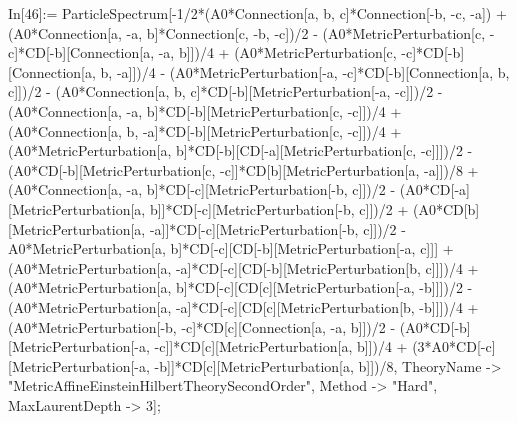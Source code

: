In[46]:= ParticleSpectrum[-1/2*(A0*Connection[a, b, c]*Connection[-b, -c, -a]) + (A0*Connection[a, -a, b]*Connection[c, -b, -c])/2 - (A0*MetricPerturbation[c, -c]*CD[-b][Connection[a, -a, b]])/4 + (A0*MetricPerturbation[c, -c]*CD[-b][Connection[a, b, -a]])/4 - (A0*MetricPerturbation[-a, -c]*CD[-b][Connection[a, b, c]])/2 - (A0*Connection[a, b, c]*CD[-b][MetricPerturbation[-a, -c]])/2 - (A0*Connection[a, -a, b]*CD[-b][MetricPerturbation[c, -c]])/4 + (A0*Connection[a, b, -a]*CD[-b][MetricPerturbation[c, -c]])/4 + (A0*MetricPerturbation[a, b]*CD[-b][CD[-a][MetricPerturbation[c, -c]]])/2 - (A0*CD[-b][MetricPerturbation[c, -c]]*CD[b][MetricPerturbation[a, -a]])/8 + (A0*Connection[a, -a, b]*CD[-c][MetricPerturbation[-b, c]])/2 - (A0*CD[-a][MetricPerturbation[a, b]]*CD[-c][MetricPerturbation[-b, c]])/2 + (A0*CD[b][MetricPerturbation[a, -a]]*CD[-c][MetricPerturbation[-b, c]])/2 - A0*MetricPerturbation[a, b]*CD[-c][CD[-b][MetricPerturbation[-a, c]]] + (A0*MetricPerturbation[a, -a]*CD[-c][CD[-b][MetricPerturbation[b, c]]])/4 + (A0*MetricPerturbation[a, b]*CD[-c][CD[c][MetricPerturbation[-a, -b]]])/2 - (A0*MetricPerturbation[a, -a]*CD[-c][CD[c][MetricPerturbation[b, -b]]])/4 + (A0*MetricPerturbation[-b, -c]*CD[c][Connection[a, -a, b]])/2 - (A0*CD[-b][MetricPerturbation[-a, -c]]*CD[c][MetricPerturbation[a, b]])/4 + (3*A0*CD[-c][MetricPerturbation[-a, -b]]*CD[c][MetricPerturbation[a, b]])/8, TheoryName -> "MetricAffineEinsteinHilbertTheorySecondOrder", Method -> "Hard", MaxLaurentDepth -> 3]; 